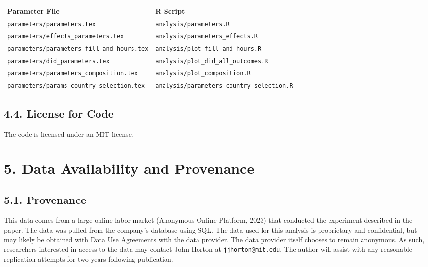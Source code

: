 \documentclass[10pt]{article}
\newenvironment{eightpt}{\begingroup\fontsize{8}{13}\selectfont}{\endgroup}
\begin{document}
\begin{eightpt}
\begin{tabularx}{\textwidth}{@{}LL@{}}
\toprule
Parameter File & R Script \\
\midrule
\texttt{parameters/parameters.tex} & \texttt{analysis/parameters.R} \\
\texttt{parameters/effects\_parameters.tex} & \texttt{analysis/parameters\_effects.R} \\
\texttt{parameters/parameters\_fill\_and\_hours.tex} & \texttt{analysis/plot\_fill\_and\_hours.R} \\
\texttt{parameters/did\_parameters.tex} & \texttt{analysis/plot\_did\_all\_outcomes.R} \\
\texttt{parameters/parameters\_composition.tex} & \texttt{analysis/plot\_composition.R} \\
\texttt{parameters/params\_country\_selection.tex} & \texttt{analysis/parameters\_country\_selection.R} \\
\bottomrule
\end{tabularx}
\end{eightpt}

\subsection*{4.4. License for Code}

The code is licensed under an MIT license.

\vspace{1em}
\section*{5. Data Availability and Provenance}

\subsection*{5.1. Provenance}

This data comes from a large online labor market (Anonymous Online Platform, 2023) that conducted the experiment described in the paper. 
The data was pulled from the company's database using SQL. 
The data used for this analysis is proprietary and confidential, but may likely be obtained with Data Use Agreements with the data provider.
The data provider itself chooses to remain anonymous.
As such, researchers interested in access to the data may contact John Horton at \texttt{jjhorton@mit.edu}. 
The author will assist with any reasonable replication attempts for two years following publication.
\end{document}
